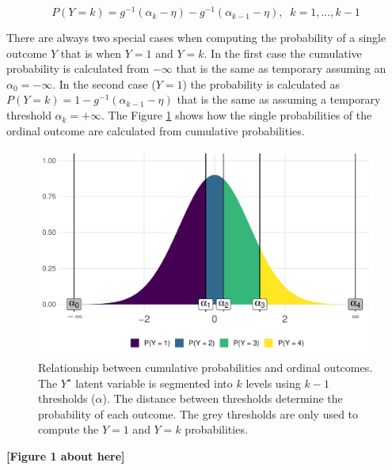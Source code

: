 \documentclass[
  man, mask,floatsintext]{apa6}
\begin{document}
\begin{equation}
P(Y = k) = g^{-1}(\alpha_k - \eta) -  g^{-1}(\alpha_{k - 1} - \eta), \;\;k = 1, \dots, k - 1
\label{eq:prob-cum-model2}
\end{equation}

There are always two special cases when computing the probability of a single outcome \(Y\) that is when \(Y = 1\) and \(Y = k\). In the first case the cumulative probability is calculated from \(-\infty\) that is the same as temporary assuming an \(\alpha_0 = -\infty\). In the second case (\(Y = 1\)) the probability is calculated as \(P(Y = k) = 1 - g^{-1}(\alpha_{k - 1} - \eta)\) that is the same as assuming a temporary threshold \(\alpha_k = +\infty\). The Figure \ref{fig:fig-explain-cumulative} shows how the single probabilities of the ordinal outcome are calculated from cumulative probabilities.

\scriptsize

\begin{figure}

{\centering \includegraphics[width=1\linewidth]{paper_files/figure-latex/fig-explain-cumulative-1} 

}

\caption{Relationship between cumulative probabilities and ordinal outcomes. The \(Y^\star\) latent variable is segmented into \(k\) levels using \(k - 1\) thresholds (\(\alpha\)). The distance between thresholds determine the probability of each outcome. The grey thresholds are only used to compute the \(Y = 1\) and \(Y = k\) probabilities.}\label{fig:fig-explain-cumulative}
\end{figure}

\begin{center}\textbf{[Figure 1 about here]} \end{center}
\end{document}

